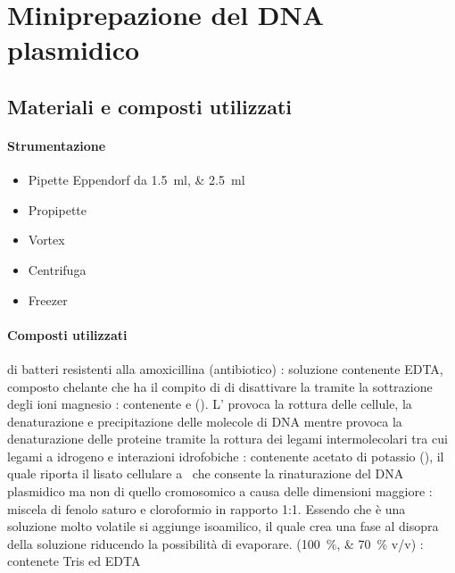 \section{Miniprepazione del DNA plasmidico}\label{sec:miniprep}

\subsection{Materiali e composti utilizzati}
\paragraph{Strumentazione}
\begin{itemize}[person]
	\item Pipette \foreignlanguage{german}{Eppendorf} da \qtylist{1.5;2.5}{\ml}
	\item Propipette
	\item \foreignlanguage{english}{Vortex}
	\item Centrifuga
	\item Freezer
\end{itemize}

\paragraph{Composti utilizzati}
\begin{itemize}[person]
	 di batteri resistenti alla amoxicillina (antibiotico)
	\itemb[\slz I]: soluzione contenente EDTA, composto chelante che ha il compito di di disattivare la  tramite la sottrazione degli ioni magnesio 
	\itemb[\slz II]: contenente  e  (). L' provoca la rottura delle cellule, la denaturazione e precipitazione delle molecole di DNA mentre  provoca la denaturazione delle proteine tramite la rottura dei legami intermolecolari tra cui legami a idrogeno e interazioni idrofobiche
	: contenente acetato di potassio (), il quale riporta il lisato cellulare a \pH\ che consente la rinaturazione del DNA plasmidico ma non di quello cromosomico a causa delle dimensioni maggiore  
	: miscela di fenolo saturo e cloroformio in rapporto 1:1. Essendo che è una soluzione molto volatile si aggiunge isoamilico, il quale crea una fase al disopra della soluzione riducendo la possibilità di evaporare. 
	 (\qtylist{100;70}{\percent} v/v)
	\itemb[\slz di TE]: contenete Tris ed EDTA
\end{itemize}

